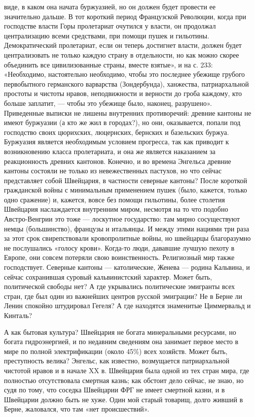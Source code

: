 виде, в  каком она начата буржуазией,  но он должен будет  провести ее
значительно дальше. В тот короткий период Французской Революции, когда
при господстве власти Горы пролетариат очутился у власти, он продолжал
централизацию  всеми   средствами,  при  помощи  пушек   и  гильотины.
Демократический пролетариат,  если он теперь достигнет  власти, должен
будет централизовать  не только  каждую страну  в отдельности,  но как
можно скорее  объединить все цивилизованные страны,  вместе взятые», и
на с.  233: «Необходимо, настоятельно необходимо,  чтобы это последнее
убежище  грубого  первобытного германского  варварства  (Зондербунда),
ханжества, патриархальной  простоты и чистоты нравов,  неподвижности и
верности  до  гроба  каждому,  кто  больше  заплатит,  ---  чтобы  это
убежище  было,  наконец,  разрушено». Приведенные  выписки  не  лишены
внутренних  противоречий: древние  кантоны не  имеют буржуазии  (а кто
же  жил  в  городах?),  но они,  оказывается,  попали  под  господство
своих цюрихских,  люцернских, бернских и базельских  буржуа. Буржуазия
является   необходимым  условием   прогресса,  так   как  приводит   к
возникновению  класса пролетариата,  и она  же является  наказанием за
реакционность древних кантонов. Конечно, и во времена Энгельса древние
кантоны состояли не  только из невежественных пастухов,  но что сейчас
представляет  собой Швейцария,  в  частности  северные кантоны?  После
короткой  гражданской войны  с  минимальным  применением пушек  (было,
кажется, только одно сражение) и, кажется, вовсе без помощи гильотины,
более столетия Швейцария наслаждается внутренним миром, несмотря на то
что  подобно Австро-Венгрии  это тоже  --- лоскутное  государство: там
мирно сосуществуют немцы (большинство),  французы и итальянцы. И между
этими  нациями три  раза  за этот  срок свирепствовали  кровопролитные
войны,  но  швейцарцы  благоразумно  не  послушались  «голосу  крови».
Когда-то люди,  дававшие лучшую пехоту  в Европе, они  совсем потеряли
свою  воинственность.  Религиозный  мир также  господствует.  Северные
кантоны  ---  католические,  Женева  ---  родина  Кальвина,  и  сейчас
сохранившая суровый кальвинистский  характер. Может быть, политической
свободы нет? А  где укрывались политические эмигранты  всех стран, где
был один из  важнейших центров русской эмиграции? Не в  Берне ли Ленин
спокойно штудировал  Гегеля? А где находятся  знаменитые Циммервальд и
Кинталь?

А как бытовая культура? Швейцария не богата минеральными ресурсами, но
богата  гидроэнергией, и  по  недавним сведениям  она занимает  первое
место  в мире  по полной  электрификации (около  45\%) всех  хозяйств.
Может быть,  преступность велика?  Энгельс, как  известно, возмущается
патриархальной чистотой нравов  и в начале XX в.  Швейцария была одной
из тех  стран мира,  где полностью  отсутствовала смертная  казнь; как
обстоит дело сейчас,  не знаю, но судя по тому,  что соседка Швейцарии
ФРГ не имеет  смертной казни, и в Швейцарии должно  быть не хуже. Один
мой  старый товарищ,  долго живший  в Берне,  жаловался, что  там «нет
происшествий».

